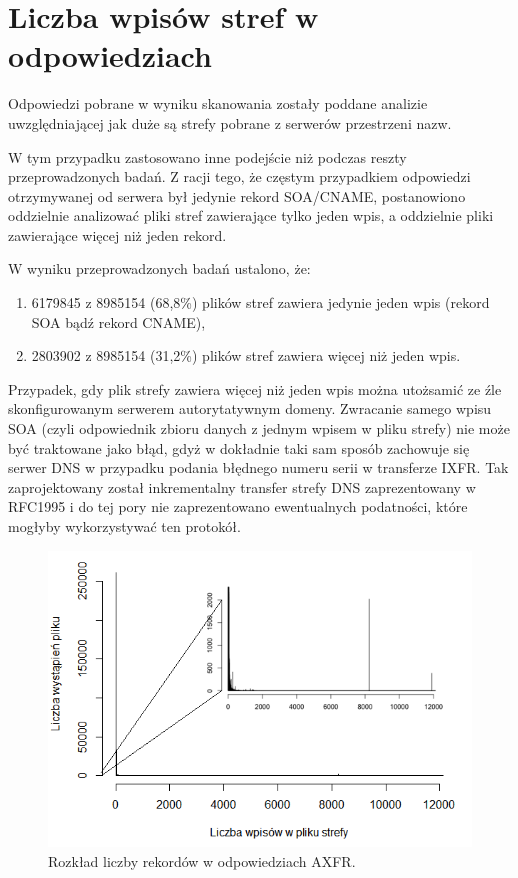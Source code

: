 \section{Liczba wpisów stref w odpowiedziach}
\noindent Odpowiedzi pobrane w wyniku skanowania zostały poddane analizie uwzględniającej jak duże są strefy pobrane z serwerów przestrzeni nazw.

W tym przypadku zastosowano inne podejście niż podczas reszty przeprowadzonych badań. Z racji tego, że częstym przypadkiem odpowiedzi
otrzymywanej od serwera był jedynie rekord SOA/CNAME, postanowiono oddzielnie analizować pliki stref zawierające tylko jeden wpis, a
oddzielnie pliki zawierające więcej niż jeden rekord.

W wyniku przeprowadzonych badań ustalono, że:
\begin{enumerate}
	\item 6179845 z 8985154 (68,8\%) plików stref zawiera jedynie jeden wpis (rekord SOA bądź rekord CNAME),
	\item 2803902 z 8985154 (31,2\%) plików stref zawiera więcej niż jeden wpis.
\end{enumerate}
Przypadek, gdy plik strefy zawiera więcej niż jeden wpis można utożsamić ze źle skonfigurowanym serwerem autorytatywnym domeny.
Zwracanie samego wpisu SOA (czyli odpowiednik zbioru danych z jednym wpisem w pliku strefy) nie może być traktowane jako błąd,
gdyż w dokładnie taki sam sposób zachowuje się serwer DNS w przypadku podania błędnego numeru serii w transferze IXFR. Tak
zaprojektowany został inkrementalny transfer strefy DNS zaprezentowany w RFC1995 \cite{RFC1995} i do tej pory nie zaprezentowano
ewentualnych podatności, które mogłyby wykorzystywać ten protokół.

\begin{figure}[h]
	\centering
	\includegraphics[width=1.0\textwidth]{image/hist_zone_size_no_title}
	\caption{Rozkład liczby rekordów w odpowiedziach AXFR.}
	\label{fig:hist_zone_size}
\end{figure}

